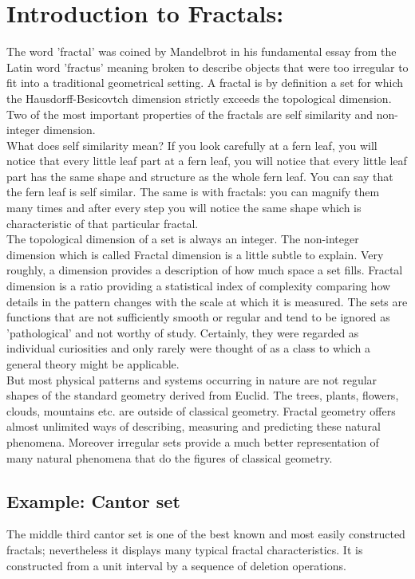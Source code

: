 \documentclass[14pt]{extarticle}
\begin{document}
\section{Introduction to Fractals:}
The word 'fractal' was coined by Mandelbrot in his fundamental essay from the Latin word 'fractus' meaning broken to describe objects that were too irregular to fit into a traditional geometrical setting. A fractal is by definition a set for which the Hausdorff-Besicovtch dimension strictly exceeds the topological dimension.\\
Two of the most important properties of the fractals are self similarity and non-integer dimension.\\
 What does self similarity mean? If you look carefully at a fern leaf, you will notice that every little leaf part at a fern leaf, you will notice that every little leaf part has the same shape and structure as the whole fern leaf. You can say that the fern leaf is self similar. The same is with fractals: you can magnify them many times and after every step you will notice the same shape which is characteristic of that particular fractal. \\
The topological dimension of a set is always an integer. The non-integer dimension which is called Fractal dimension is a little subtle to explain. Very roughly, a dimension provides a description of how much space a set fills. Fractal dimension is a ratio providing a statistical index of complexity comparing how details in the pattern changes with the scale at which it is measured. The sets are functions that are not sufficiently smooth or regular and tend to be ignored as 'pathological' and not worthy of study. Certainly, they were regarded as individual curiosities and only rarely were thought of as a class to which a general theory might be applicable.\\
But most physical patterns and systems occurring in nature are not regular shapes of the standard geometry derived from Euclid. The trees, plants, flowers, clouds, mountains etc. are outside of classical geometry. Fractal geometry offers almost unlimited ways of describing, measuring and predicting these natural phenomena. Moreover irregular sets provide a much better representation of many natural phenomena that do the figures of classical geometry.

\newpage


\subsection{Example: Cantor set}
The middle third cantor set is one of the best known and most easily constructed fractals; nevertheless it displays many typical fractal characteristics. It is constructed from a unit interval by a sequence of deletion operations.\\
\end{document}
